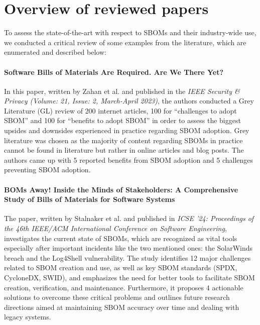 \section{Overview of reviewed papers}

To assess the state-of-the-art with respect to SBOMs and their industry-wide use, we conducted a critical review of some examples from the literature, which are enumerated and described below:

\paragraph{Software Bills of Materials Are Required. Are We There Yet?} \cite{article:sbom-required} In this paper, written by Zahan et al. and published in the \emph{IEEE Security \& Privacy (Volume: 21, Issue: 2, March-April 2023)}, the authors conducted a Grey Literature (GL) review of 200 internet articles, 100 for \enquote{challenges to adopt SBOM} and 100 for \enquote{benefits to adopt SBOM} in order to assess the biggest upsides and downsides experienced in practice regarding SBOM adoption. Grey literature was chosen as the majority of content regarding SBOMs in practice cannot be found in literature but rather in online articles and blog posts. The authors came up with 5 reported benefits from SBOM adoption and 5 challenges preventing SBOM adoption.

\paragraph{BOMs Away! Inside the Minds of Stakeholders: A Comprehensive Study of Bills of Materials for Software Systems} \cite{article:software-bom} The paper, written by Stalnaker et al. and published in \emph{ICSE '24: Proceedings of the 46th IEEE/ACM International Conference on Software Engineering}, investigates the current state of SBOMs, which are recognized as vital tools especially after important incidents like the two mentioned ones: the SolarWinds breach and the Log4Shell vulnerability. The study identifies 12 major challenges related to SBOM creation and use, as well as key SBOM standards (SPDX, CycloneDX, SWID), and emphasizes the need for better tools to facilitate SBOM creation, verification, and maintenance. Furthermore, it proposes 4 actionable solutions to overcome these critical problems and outlines future research directions aimed at maintaining SBOM accuracy over time and dealing with legacy systems.

